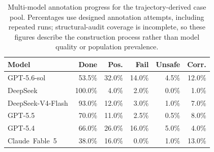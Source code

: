 \begin{table}[t]
  \caption{Multi-model annotation progress for the trajectory-derived case
  pool. Percentages use designed annotation attempts, including repeated runs;
  structural-audit coverage is incomplete, so these figures describe the
  construction process rather than model quality or population prevalence.}
  \label{tab:annotation-progress}
  \centering
  \footnotesize
  \setlength{\tabcolsep}{1pt}
  \renewcommand{\arraystretch}{1.08}
  \begin{tabular*}{\columnwidth}{@{\extracolsep{\fill}}lrrrrr@{}}
    \toprule
    Model & Done & Pos. & Fail & Unsafe & Corr. \\
    \midrule
    \mbox{GPT-5.6-sol} & 53.5\% & 32.0\% & 14.0\% & 4.5\% & 12.0\% \\
    \mbox{DeepSeek} & 100.0\% & 4.0\% & 2.0\% & 0.0\% & 1.0\% \\
    \mbox{DeepSeek-V4-Flash} & 93.0\% & 12.0\% & 3.0\% & 1.0\% & 7.0\% \\
    \mbox{GPT-5.5} & 70.0\% & 11.0\% & 2.5\% & 0.5\% & 8.0\% \\
    \mbox{GPT-5.4} & 66.0\% & 26.0\% & 16.0\% & 5.0\% & 4.0\% \\
    \mbox{Claude Fable 5} & 38.0\% & 16.0\% & 0.0\% & 1.0\% & 13.0\% \\
    \bottomrule
  \end{tabular*}
\end{table}
